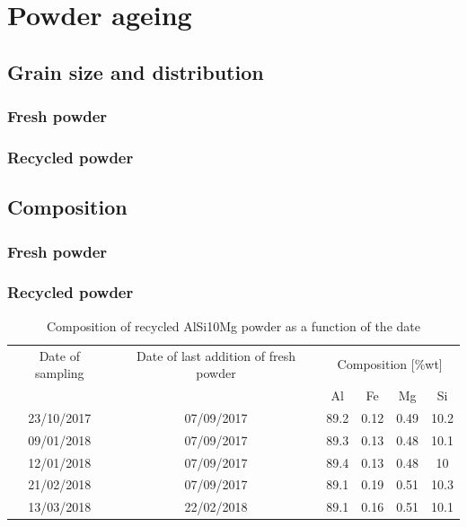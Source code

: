 \section{Powder ageing}

\subsection{Grain size and distribution}
\subsubsection{Fresh powder}

\subsubsection{Recycled powder}
\subsection{Composition}

\subsubsection{Fresh powder}

\subsubsection{Recycled powder}
 \begin{center}
\begin{table}[ht]
\begin{tabular}{|c|c |c |c| c|c|}
    \hline
    Date of sampling& Date of last addition of fresh powder & \multicolumn{4}{c}{Composition [\%wt]} \vline\\
    \cline{3-6}
    & & Al& Fe&Mg&Si\\
\hline 
\hline   
    23/10/2017 & 07/09/2017 &89.2&0.12&0.49&10.2\\
    09/01/2018 & 07/09/2017 & 89.3 & 0.13 &0.48&10.1\\
    12/01/2018 & 07/09/2017 & 89.4 & 0.13 &0.48&10\\
    21/02/2018& 07/09/2017 &89.1&0.19&0.51&10.3\\
    13/03/2018& 22/02/2018 &89.1&0.16&0.51&10.1\\    
    \hline
\end{tabular}

\caption[Composition of recycled AlSi10Mg powder as a function of the date]{Composition of recycled AlSi10Mg powder as a function of the date}
\label{tab:compo}
\end{table}
 \end{center}

